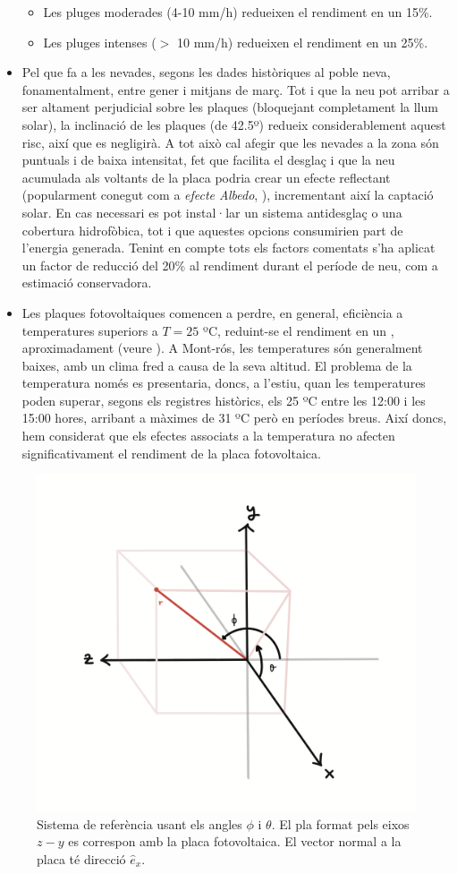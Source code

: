 \documentclass[10pt, twoside, a4paper]{article}
\begin{document}
\begin{itemize}
\begin{itemize}
        \item Les pluges moderades (4-10 mm/h) redueixen el rendiment en un 15\%.
        \item Les pluges intenses ($>$ 10 mm/h) redueixen el rendiment en un 25\%.
    \end{itemize}
    \item Pel que fa a les nevades, segons les dades històriques al poble neva, fonamentalment, entre gener i mitjans de març. Tot i que la neu pot arribar a ser altament perjudicial sobre les plaques (bloquejant completament la llum solar), la inclinació de les plaques (de 42.5º) redueix considerablement aquest risc, així que es negligirà. A tot això cal afegir que les nevades a la zona són puntuals i de baixa intensitat, fet que facilita el desglaç i que la neu acumulada als voltants de la placa podria crear un efecte reflectant (popularment conegut com a \textit{efecte Albedo}, \cite{ref10}), incrementant així la captació solar.
    En cas necessari es pot instal·lar un sistema antidesglaç o una cobertura hidrofòbica, tot i que aquestes opcions consumirien part de l'energia generada. 
    Tenint en compte tots els factors comentats s'ha aplicat un factor de reducció del 20\% al rendiment durant el període de neu, com a estimació conservadora.
    \item Les plaques fotovoltaiques comencen a perdre, en general, eficiència a temperatures superiors a $T=25$ ºC, reduint-se el rendiment en un , aproximadament (veure \cite{ref8}). A Mont-rós, les temperatures són generalment baixes, amb un clima fred a causa de la seva altitud. El problema de la temperatura només es presentaria, doncs, a l'estiu, quan les temperatures poden superar, segons els registres històrics, els 25 ºC entre les 12:00 i les 15:00 hores, arribant a màximes de 31 ºC però en períodes breus. 
    Així doncs, hem considerat que els efectes associats a la temperatura no afecten significativament el rendiment de la placa fotovoltaica.

\end{itemize}

\begin{figure}[h!]
    \centering
    \includegraphics[width=0.5\linewidth]{../latex/Coordenades.png}
    \caption{Sistema de referència usant els angles $\phi$ i $\theta$. El pla format pels eixos $z-y$ es correspon amb la placa fotovoltaica. El vector normal a la placa té direcció $\hat{e}_x$.}
    \label{fig:sr}
\end{figure}
\end{document}
